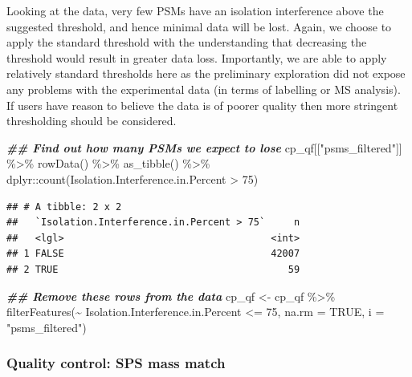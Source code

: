 \documentclass[9pt,a4paper,]{extarticle}
\newenvironment{Shaded}{\begin{snugshade}}{\end{snugshade}}
\newcommand{\AttributeTok}[1]{\textcolor[rgb]{0.77,0.63,0.00}{#1}}
\newcommand{\ConstantTok}[1]{\textcolor[rgb]{0.00,0.00,0.00}{#1}}
\newcommand{\DecValTok}[1]{\textcolor[rgb]{0.00,0.00,0.81}{#1}}
\newcommand{\DocumentationTok}[1]{\textcolor[rgb]{0.56,0.35,0.01}{\textbf{\textit{#1}}}}
\newcommand{\FunctionTok}[1]{\textcolor[rgb]{0.00,0.00,0.00}{#1}}
\newcommand{\NormalTok}[1]{#1}
\newcommand{\OtherTok}[1]{\textcolor[rgb]{0.56,0.35,0.01}{#1}}
\newcommand{\SpecialCharTok}[1]{\textcolor[rgb]{0.00,0.00,0.00}{#1}}
\newcommand{\StringTok}[1]{\textcolor[rgb]{0.31,0.60,0.02}{#1}}
\begin{document}
Looking at the data, very few PSMs have an isolation interference above the
suggested threshold, and hence minimal data will be lost. Again, we choose to
apply the standard threshold with the understanding that decreasing the
threshold would result in greater data loss. Importantly, we are able to apply
relatively standard thresholds here as the preliminary exploration did not
expose any problems with the experimental data (in terms of labelling or MS
analysis). If users have reason to believe the data is of poorer quality then
more stringent thresholding should be considered.

\begin{Shaded}
\begin{Highlighting}[]
\DocumentationTok{\#\# Find out how many PSMs we expect to lose}
\NormalTok{cp\_qf[[}\StringTok{"psms\_filtered"}\NormalTok{]] }\SpecialCharTok{\%\textgreater{}\%} 
  \FunctionTok{rowData}\NormalTok{() }\SpecialCharTok{\%\textgreater{}\%} 
  \FunctionTok{as\_tibble}\NormalTok{() }\SpecialCharTok{\%\textgreater{}\%} 
\NormalTok{  dplyr}\SpecialCharTok{::}\FunctionTok{count}\NormalTok{(Isolation.Interference.in.Percent }\SpecialCharTok{\textgreater{}} \DecValTok{75}\NormalTok{)}
\end{Highlighting}
\end{Shaded}

\begin{verbatim}
## # A tibble: 2 x 2
##   `Isolation.Interference.in.Percent > 75`     n
##   <lgl>                                    <int>
## 1 FALSE                                    42007
## 2 TRUE                                        59
\end{verbatim}

\begin{Shaded}
\begin{Highlighting}[]
\DocumentationTok{\#\# Remove these rows from the data}
\NormalTok{cp\_qf }\OtherTok{\textless{}{-}}\NormalTok{ cp\_qf }\SpecialCharTok{\%\textgreater{}\%}
  \FunctionTok{filterFeatures}\NormalTok{(}\SpecialCharTok{\textasciitilde{}}\NormalTok{ Isolation.Interference.in.Percent }\SpecialCharTok{\textless{}=} \DecValTok{75}\NormalTok{, }
                 \AttributeTok{na.rm =} \ConstantTok{TRUE}\NormalTok{,}
                 \AttributeTok{i =} \StringTok{"psms\_filtered"}\NormalTok{)}
\end{Highlighting}
\end{Shaded}

\hypertarget{quality-control-sps-mass-match}{%
\subsubsection{Quality control: SPS mass match}\label{quality-control-sps-mass-match}}
\end{document}
